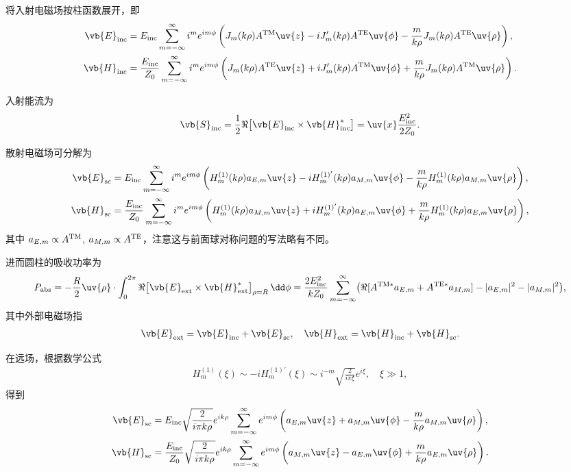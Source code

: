 将入射电磁场按柱函数展开，即
\begin{align*}
	\vb{E}_{\rm inc} & = E_{\rm inc} \sum_{m=-\infty}^{\infty} i^m e^{im\phi} \left( J_m(k\rho) A^{\rm TM} \uv{z} - i J_m'(k\rho) A^{\rm TE} \uv{\phi} - \frac{m}{k\rho} J_m(k\rho) A^{\rm TE} \uv{\rho} \right),             \\
	\vb{H}_{\rm inc} & = \frac{E_{\rm inc}}{Z_0} \sum_{m=-\infty}^{\infty} i^m e^{im\phi} \left( J_m(k\rho) A^{\rm TE} \uv{z} + i J_m'(k\rho) A^{\rm TM} \uv{\phi} + \frac{m}{k\rho} J_m(k\rho) A^{\rm TM} \uv{\rho} \right).
\end{align*}

入射能流为
\begin{align*}
	\vb{S}_{\rm inc} = \frac12 \Re\bigl[ \vb{E}_{\rm inc} \times \vb{H}_{\rm inc}^* \bigr] = \uv{x} \frac{E_{\rm inc}^2}{2Z_0}.
\end{align*}

散射电磁场可分解为
\begin{align*}
	\vb{E}_{\rm sc} & = E_{\rm inc} \sum_{m=-\infty}^{\infty} i^m e^{im\phi} \left( H_m^{(1)}(k\rho) a_{E,m} \uv{z} - i H_m^{(1)'}(k\rho) a_{M,m} \uv{\phi} - \frac{m}{k\rho} H_m^{(1)}(k\rho) a_{M,m} \uv{\rho} \right),             \\
	\vb{H}_{\rm sc} & = \frac{E_{\rm inc}}{Z_0} \sum_{m=-\infty}^{\infty} i^m e^{im\phi} \left( H_m^{(1)}(k\rho) a_{M,m} \uv{z} + i H_m^{(1)'}(k\rho) a_{E,m} \uv{\phi} + \frac{m}{k\rho} H_m^{(1)}(k\rho) a_{E,m} \uv{\rho} \right),
\end{align*}
其中 \(a_{E,m} \propto A^{\rm TM}\), \(a_{M,m} \propto A^{\rm TE}\)，注意这与前面球对称问题的写法略有不同。

进而圆柱的吸收功率为
\begin{align*}
	P_{\rm abs} = -\frac{R}{2} \uv{\rho} \cdot \int_0^{2\pi} \Re\bigl[ \vb{E}_{\rm ext} \times \vb{H}_{\rm ext}^* \bigr]_{\rho=R} \,\dd \phi = \frac{2E_{\rm inc}^2}{kZ_0} \sum_{m=-\infty}^{\infty} \bigl( \Re[A^{\rm TM*} a_{E,m} + A^{\rm TE*} a_{M,m}] - |a_{E,m}|^2 - |a_{M,m}|^2 \bigr),
\end{align*}
其中外部电磁场指
\begin{align*}
	\vb{E}_{\rm ext} = \vb{E}_{\rm inc} + \vb{E}_{\rm sc}, \quad \vb{H}_{\rm ext} = \vb{H}_{\rm inc} + \vb{H}_{\rm sc}.
\end{align*}

在远场，根据数学公式
\begin{align*}
	H_m^{(1)}(\xi) \sim -i H_m^{(1)'}(\xi) \sim i^{-m} \sqrt{\frac{2}{i\pi\xi}} e^{i\xi}, \quad \xi \gg 1,
\end{align*}
得到
\begin{align*}
	\vb{E}_{\rm sc} & = E_{\rm inc} \sqrt{\frac{2}{i\pi k\rho}} e^{ik\rho} \sum_{m=-\infty}^{\infty} e^{im\phi} \left( a_{E,m} \uv{z} + a_{M,m} \uv{\phi} - \frac{m}{k\rho} a_{M,m} \uv{\rho} \right),             \\
	\vb{H}_{\rm sc} & = \frac{E_{\rm inc}}{Z_0} \sqrt{\frac{2}{i\pi k\rho}} e^{ik\rho} \sum_{m=-\infty}^{\infty} e^{im\phi} \left( a_{M,m} \uv{z} - a_{E,m} \uv{\phi} + \frac{m}{k\rho} a_{E,m} \uv{\rho} \right).
\end{align*}

